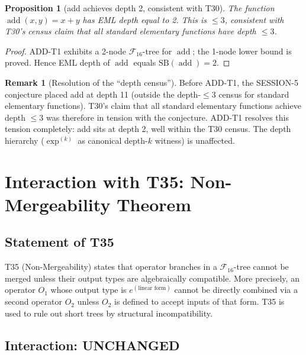 \documentclass[12pt,a4paper]{article}
\newtheorem{proposition}[theorem]{Proposition}
\theoremstyle{definition}
\newtheorem{remark}[theorem]{Remark}
\newcommand{\addop}{\operatorname{add}}
\newcommand{\SB}{\mathrm{SB}}
\newcommand{\F}{\mathcal{F}_{16}}
\newcommand{\Unchanged}{\textcolor{unchanged}{\textbf{UNCHANGED}}}
\begin{document}
\begin{proposition}[add achieves depth 2, consistent with T30]
The function $\addop(x,y)=x+y$ has EML depth equal to 2.
This is $\leq 3$, consistent with T30's census claim that all standard
elementary functions have depth $\leq 3$.
\end{proposition}

\begin{proof}
ADD-T1 exhibits a 2-node $\F$-tree for $\addop$; the 1-node lower bound is proved.
Hence EML depth of $\addop$ equals $\SB(\addop)=2$.
\end{proof}

\begin{remark}[Resolution of the ``depth census'']
Before ADD-T1, the SESSION-5 conjecture placed add at depth 11 (outside the
depth-$\leq 3$ census for standard elementary functions).  T30's claim that
all standard elementary functions achieve depth $\leq 3$ was therefore in tension
with the conjecture.  ADD-T1 resolves this tension completely: add sits at depth 2,
well within the T30 census.  The depth hierarchy ($\exp^{(k)}$ as canonical
depth-$k$ witness) is unaffected.
\end{remark}

\section{Interaction with T35: Non-Mergeability Theorem}
\label{sec:T35}

\subsection{Statement of T35}

T35 (Non-Mergeability) states that operator branches in a $\F$-tree cannot be
merged unless their output types are algebraically compatible.  More precisely,
an operator $O_1$ whose output type is $e^{(\text{linear form})}$ cannot be
directly combined via a second operator $O_2$ unless $O_2$ is defined to accept
inputs of that form.  T35 is used to rule out short trees by structural
incompatibility.

\subsection{Interaction: \Unchanged}
\end{document}
